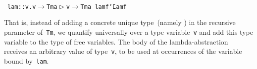 \documentclass[9pt,authoryear]{sigplanconf}
\begin{document}
%
%
%
~\\~\vphantom{$\{$}\texttt{lam}\texttt{\mbox{\hspace{0.50em}}}\texttt{{:}{:}}\texttt{\mbox{\hspace{0.50em}}}\texttt{\makebox[1.22ex][l]{$ {(} $}}\texttt{\makebox[1.22ex][c]{$ \forall $}}\texttt{\mbox{\hspace{0.50em}}}\texttt{v}\texttt{.}\texttt{\mbox{\hspace{0.50em}}}\texttt{v}\texttt{\mbox{\hspace{0.50em}}}\texttt{$ \rightarrow $}\texttt{\mbox{\hspace{0.50em}}}\texttt{Tm}\texttt{\mbox{\hspace{0.50em}}}\texttt{\makebox[1.22ex][l]{$ {(} $}}\texttt{a}\texttt{\mbox{\hspace{0.50em}}}\texttt{$ \vartriangleright $}\texttt{\mbox{\hspace{0.50em}}}\texttt{v}\texttt{\makebox[1.22ex][r]{$ {)} $}}\texttt{\makebox[1.22ex][r]{$ {)} $}}\texttt{\mbox{\hspace{0.50em}}}\texttt{$ \rightarrow $}\texttt{\mbox{\hspace{0.50em}}}\texttt{Tm}\texttt{\mbox{\hspace{0.50em}}}\texttt{a}\texttt{{\nopagebreak \newline%
}\vphantom{$\{$}}\texttt{lam}\texttt{\mbox{\hspace{0.50em}}}\texttt{f}\texttt{\mbox{\hspace{0.50em}}}\texttt{{\char `\=}}\texttt{\mbox{\hspace{0.50em}}}\texttt{Lam}\texttt{\mbox{\hspace{0.50em}}}\texttt{\makebox[1.22ex][l]{$ {(} $}}\texttt{f}\texttt{\mbox{\hspace{0.50em}}}\texttt{\makebox[1.22ex][l]{$ {(} $}}\texttt{\makebox[1.22ex][r]{$ {)} $}}\texttt{\makebox[1.22ex][r]{$ {)} $}}\texttt{{\nopagebreak \newline%
}\vphantom{$\{$}}%


%
That is, instead of adding a concrete unique type{~}(namely \texttt{\makebox[1.22ex][l]{$ {(} $}}\texttt{\makebox[1.22ex][r]{$ {)} $}}) in
    the recursive parameter of{~}\texttt{Tm}, we quantify universally over a
    type variable{~}\texttt{v} and add this type variable to the type of free
    variables. The body of the lambda-abstraction receives an arbitrary
    value of type{~}\texttt{v}, to be used at occurrences of the variable bound
    by{~}\texttt{lam}.%
\end{document}
